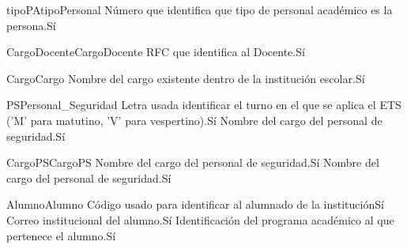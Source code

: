 \begin{cdtEntidad}{tipoPA}{tipoPersonal}
	{Número que identifica que tipo de personal académico es la persona.}{Sí}
\end{cdtEntidad}
\begin{cdtEntidad}{CargoDocente}{CargoDocente}
	{RFC que identifica al Docente.}{Sí}
\end{cdtEntidad}
\begin{cdtEntidad}{Cargo}{Cargo}
	{Nombre del cargo existente dentro de la institución escolar.}{Sí}
\end{cdtEntidad}
\begin{cdtEntidad}{PS}{Personal\_Seguridad}
	{Letra usada identificar el turno en el que se aplica el ETS ('M' para matutino, 'V' para vespertino).}{Sí}
	{Nombre del cargo del personal de seguridad.}{Sí}
	\cdtEntityRelSection
\end{cdtEntidad}
\begin{cdtEntidad}{CargoPS}{CargoPS}
	{Nombre del cargo del personal de seguridad.}{Sí}
	{Nombre del cargo del personal de seguridad.}{Sí}
\end{cdtEntidad}
\begin{cdtEntidad}{Alumno}{Alumno}
	{Código usado para identificar al alumnado de la institución}{Sí}
	{Correo institucional del alumno.}{Sí}
	{Identificación del programa académico al que pertenece el alumno.}{Sí}
\end{cdtEntidad}
